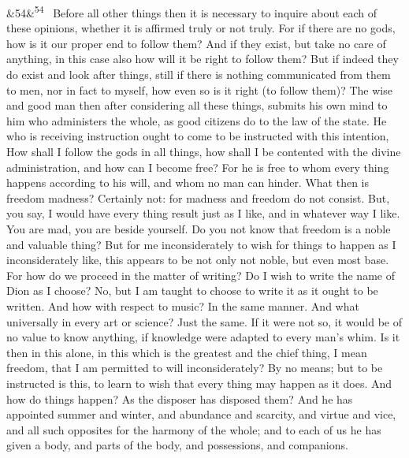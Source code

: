 \documentclass[12pt]{article}
\newcommand{\para}[1][]{\par\noindent\ifx&#1&\else\textsuperscript{\footnotesize #1}~\fi}
\begin{document}
\para[54] Before all other things then it is necessary to inquire about each of these opinions, whether it is affirmed truly or not truly. For if there are no gods, how is it our proper end to follow them? And if they exist, but take no care of anything, in this case also how will it be right to follow them? But if indeed they do exist and look after things, still if there is nothing communicated from them to men, nor in fact to myself, how even so is it right (to follow them)? The wise and good man then after considering all these things, submits his own mind to him who administers the whole, as good citizens do to the law of the state. He who is receiving instruction ought to come to be instructed with this intention, How shall I follow the gods in all things, how shall I be contented with the divine administration, and how can I become free? For he is free to whom every thing happens according to his will, and whom no man can hinder. What then is freedom madness? Certainly not: for madness and freedom do not consist. But, you say, I would have every thing result just as I like, and in whatever way I like. You are mad, you are beside yourself. Do you not know that freedom is a noble and valuable thing? But for me inconsiderately to wish for things to happen as I inconsiderately like, this appears to be not only not noble, but even most base. For how do we proceed in the matter of writing? Do I wish to write the name of Dion as I choose? No, but I am taught to choose to write it as it ought to be written. And how with respect to music? In the same manner. And what universally in every art or science? Just the same. If it were not so, it would be of no value to know anything, if knowledge were adapted to every man's whim. Is it then in this alone, in this which is the greatest and the chief thing, I mean freedom, that I am permitted to will inconsiderately? By no means; but to be instructed is this, to learn to wish that every thing may happen as it does. And how do things happen? As the disposer has disposed them? And he has appointed summer and winter, and abundance and scarcity, and virtue and vice, and all such opposites for the harmony of the whole; and to each of us he has given a body, and parts of the body, and possessions, and companions.
\end{document}
